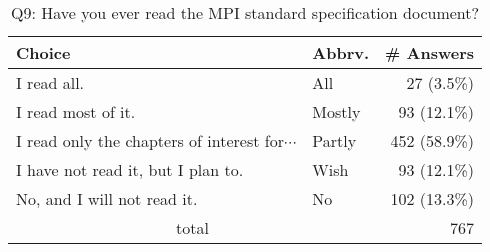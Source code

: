 \begin{table}[htb]%
\begin{center}%
\caption{Q9: Have you ever read the MPI standard specification document?}%
\label{tab:Q9-ans}%
\begin{tabular}{l|l|r}%
\hline%
Choice & Abbrv. & \# Answers \\%
\hline%
I read all. & All & 27 (3.5\%) \\%
I read most of it. & Mostly & 93 (12.1\%) \\%
{\small I read only the chapters of interest for$\cdots$} & Partly & 452 (58.9\%) \\%
I have not read it, but I plan to. & Wish & 93 (12.1\%) \\%
No, and I will not read it. & No & 102 (13.3\%) \\%
\hline%
\multicolumn{2}{c}{total} & 767 \\%
\hline%
\end{tabular}%
\end{center}%
\end{table}%
